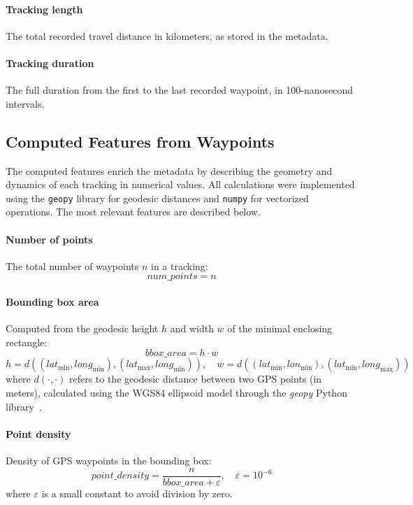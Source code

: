 \documentclass[a4paper,12pt,twoside]{scrreprt}
\begin{document}
\paragraph{Tracking length}
The total recorded travel distance in kilometers, as stored in the metadata.

\paragraph{Tracking duration}
The full duration from the first to the last recorded waypoint, in
100-nanosecond intervals.

\subsection{Computed Features from Waypoints}
The computed features enrich the metadata by describing the geometry and
dynamics of each
tracking in numerical values.
All calculations were implemented using the \texttt{geopy} library for geodesic
distances and \texttt{numpy} for vectorized operations.
The most relevant features are described below.

\paragraph{Number of points}

The total number of waypoints $n$ in a tracking:
\[
  num\_points = n
\]

\paragraph{Bounding box area}

Computed from the geodesic height $h$ and width $w$ of the minimal enclosing
rectangle:
\[
  bbox\_area = h \cdot w
\]
\[
  h = d((lat_{\min}, long_{\min}), (lat_{\max}, long_{\min})), \quad w =
  d((lat_{\min}, lon_{\min}), (lat_{\min}, long_{\max}))
\]
where $d(\cdot, \cdot)$ refers to the geodesic distance between two GPS points
(in
meters), calculated using the WGS84 ellipsoid model through the \textit{geopy}
Python library~\cite{noauthor_welcome_nodate}.

\paragraph{Point density}

Density of GPS waypoints in the bounding box:
\[
  point\_density = \frac{n}{bbox\_area + \varepsilon}, \quad
  \varepsilon = 10^{-6}
\]
where $\varepsilon$ is a small constant to avoid division by zero.
\end{document}
